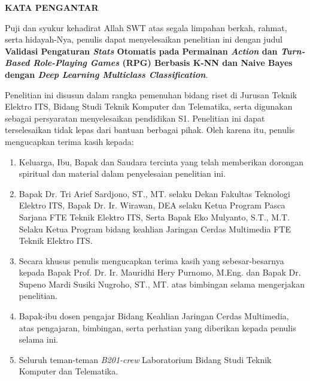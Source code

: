 \begin{center}
\Large\textbf{KATA PENGANTAR}
\end{center}
\vspace{2ex}

\setlength{\parindent}{1cm} Puji dan syukur kehadirat Allah SWT atas segala limpahan berkah, rahmat, serta hidayah-Nya, penulis  dapat menyelesaikan penelitian ini dengan judul \textbf{Validasi Pengaturan \textit{Stats} Otomatis pada Permainan \textit{Action} dan \textit{Turn-Based Role-Playing Games} (RPG) Berbasis K-NN dan Naive Bayes dengan \textit{Deep Learning Multiclass Classification}}.
\vspace{1ex}

Penelitian ini disusun dalam rangka pemenuhan bidang riset di Jurusan Teknik Elektro ITS, Bidang  Studi Teknik Komputer dan Telematika, serta digunakan sebagai persyaratan menyelesaikan pendidikan  S1. Penelitian ini dapat terselesaikan tidak lepas dari bantuan berbagai pihak. Oleh karena itu, penulis mengucapkan terima kasih kepada:
\vspace{1ex}

\begin{enumerate}[nolistsep]
	\item Keluarga, Ibu, Bapak dan Saudara tercinta yang telah memberikan dorongan spiritual dan material dalam penyelesaian penelitian ini.
	\vspace{1ex}
	\item Bapak Dr. Tri Arief Sardjono, ST., MT. selaku Dekan Fakultas Teknologi Elektro ITS, Bapak Dr. Ir. Wirawan, DEA selaku Ketua Program Pasca Sarjana FTE Teknik Elektro ITS, Serta Bapak Eko Mulyanto, S.T., M.T. Selaku Ketua Program bidang keahlian Jaringan Cerdas Multimedia FTE Teknik Elektro ITS.
	\vspace{1ex}
	\item Secara khusus penulis mengucapkan terima kasih yang sebesar-besarnya kepada Bapak Prof. Dr. Ir. Mauridhi Hery Purnomo, M.Eng. dan Bapak Dr. Supeno Mardi Susiki Nugroho, ST., MT. atas bimbingan selama mengerjakan  penelitian.
	\vspace{1ex}
	\item Bapak-ibu dosen pengajar Bidang Keahlian Jaringan Cerdas Multimedia, atas pengajaran,  bimbingan, serta perhatian yang diberikan kepada penulis selama ini.
	\vspace{1ex}
	\item Seluruh teman-teman \textit{B201-crew} Laboratorium Bidang Studi Teknik Komputer dan Telematika.
\end{enumerate}
\vspace{1ex}

